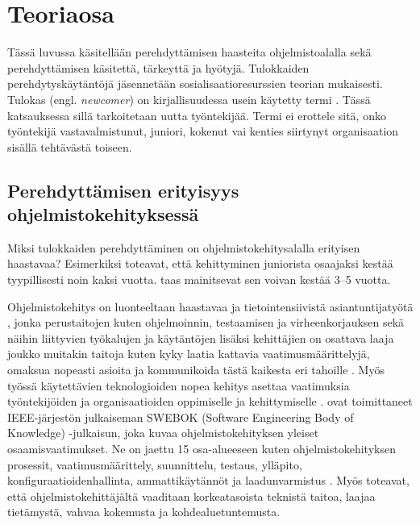 \documentclass[utf8]{gradu3}
\begin{document}
\chapter{Teoriaosa}
\label{paaluku-teoria}

Tässä luvussa käsitellään perehdyttämisen haasteita ohjelmistoalalla sekä perehdyttämisen käsitettä, tärkeyttä ja hyötyjä. Tulokkaiden perehdytyskäytäntöjä jäsennetään sosialisaatioresurssien teorian \parencite{saks-gruman-2012} mukaisesti. Tulokas (engl. \textit{newcomer}) on kirjallisuudessa usein käytetty termi %
\parencites%
    [mm.][]{matturro-ym-2017}%
    {bauer-erdogan-2012}%
    {begel-simon-2008-all-over-again}%
    {steinmacher-ym-2015}%
    {britto-ym-2019}%
\relax.
%
Tässä katsauksessa sillä tarkoitetaan uutta työntekijää. Termi ei erottele sitä, onko työntekijä vastavalmistunut, juniori, kokenut vai kenties siirtynyt organisaation sisällä tehtävästä toiseen.

\section{Perehdyttämisen erityisyys ohjelmistokehityksessä}
\label{luku-perehdyttämisen-erityisyys-ohjelmistoalalla}

Miksi tulokkaiden perehdyttäminen on ohjelmistokehitysalalla erityisen haastavaa? Esimerkiksi \textcite{bologa-lupu-2014} toteavat, että kehittyminen juniorista osaajaksi kestää tyypillisesti noin kaksi vuotta. \textcite{britto-ym-2020} taas mainitsevat sen voivan kestää 3--5 vuotta.

Ohjelmistokehitys on luonteeltaan haastavaa ja tietointensiivistä asiantuntijatyötä \parencite{viana-ym-2014}, jonka perustaitojen kuten ohjelmoinnin, testaamisen ja virheenkorjauksen sekä näihin liittyvien työkalujen ja käytäntöjen lisäksi kehittäjien on osattava laaja joukko muitakin taitoja kuten kyky laatia kattavia vaatimusmäärittelyjä, omaksua nopeasti asioita ja kommunikoida tästä kaikesta eri tahoille %
\parencites%
    {tejera-hernández-ym-2018}%
    {begel-simon-2008-all-over-again}%
\relax.
%
Myös työssä käytettävien teknologioiden nopea kehitys asettaa vaatimuksia työntekijöiden ja organisaatioiden oppimiselle ja kehittymiselle \parencite{tejera-hernández-ym-2018}. \textcite{swebok} ovat toimittaneet IEEE-järjestön julkaiseman SWEBOK (Software Engineering Body of Knowledge) -julkaisun, joka kuvaa ohjelmistokehityksen yleiset osaamisvaatimukset. Ne on jaettu 15 osa-alueeseen kuten ohjelmistokehityksen prosessit, vaatimusmäärittely, suunnittelu, testaus, ylläpito, konfiguraatioidenhallinta, ammattikäytännöt ja laadunvarmistus \parencite{swebok}. Myös \textcite{gregory-ym-2020} toteavat, että ohjelmistokehittäjältä vaaditaan korkeatasoista teknistä taitoa, laajaa tietämystä, vahvaa kokemusta ja kohdealuetuntemusta. 
\end{document}
